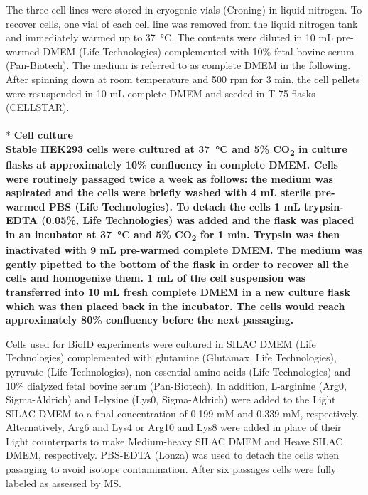 The three cell lines were stored in cryogenic vials (Croning) in liquid nitrogen. To recover cells, one vial of each cell line was removed from the liquid nitrogen tank and immediately warmed up to \SI{37}{\celsius}. The contents were diluted in 10 mL pre-warmed DMEM (Life Technologies) complemented with 10\% fetal bovine serum (Pan-Biotech). The medium is referred to as complete DMEM in the following. After spinning down at room temperature and 500 rpm for 3 min, the cell pellets were resuspended in 10 mL complete DMEM and seeded in T-75 flasks (CELLSTAR).
\\
\\*
\bfseries{Cell culture}\\
\normalfont Stable HEK293 cells were cultured at \SI{37}{\celsius} and 5\% CO\textsubscript{2} in culture flasks at approximately 10\% confluency in complete DMEM. Cells were routinely passaged twice a week as follows: the medium was aspirated and the cells were briefly washed with 4 mL sterile pre-warmed PBS (Life Technologies). To detach the cells 1 mL trypsin-EDTA (0.05\%, Life Technologies) was added and the flask was placed in an incubator at \SI{37}{\celsius} and 5\% CO\textsubscript{2} for 1 min. Trypsin was then inactivated with 9 mL pre-warmed complete DMEM. The medium was gently pipetted to the bottom of the flask in order to recover all the cells and homogenize them. 1 mL of the cell suspension was transferred into 10 mL fresh complete DMEM in a new culture flask which was then placed back in the incubator. The cells would reach approximately 80\% confluency before the next passaging.

Cells used for BioID experiments were cultured in SILAC DMEM (Life Technologies) complemented with glutamine (Glutamax, Life Technologies), pyruvate (Life Technologies), non-essential amino acids (Life Technologies) and 10\% dialyzed fetal bovine serum (Pan-Biotech). In addition, L-arginine (Arg0, Sigma-Aldrich) and L-lysine (Lys0, Sigma-Aldrich) were added to the Light SILAC DMEM to a final concentration of 0.199 mM and 0.339 mM, respectively. Alternatively, Arg6 and Lys4 or Arg10 and Lys8 were added in place of their Light counterparts to make Medium-heavy SILAC DMEM and Heave SILAC DMEM, respectively. PBS-EDTA (Lonza) was used to detach the cells when passaging to avoid isotope contamination. After six passages cells were fully labeled as assessed by MS.

